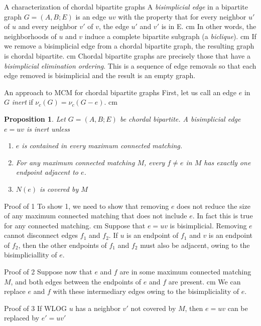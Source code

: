 \documentclass{beamer}
\newtheorem{prop}{Proposition}
\newcommand{\bframe}[2]{\begin{frame}{#1}#2\end{frame}}
\begin{document}
\bframe{A characterization of chordal bipartite graphs}{
A {\it bisimplicial edge} in a bipartite graph $G = (A, B; E)$ is an edge $uv$ with the property that for every neighbor $u'$ of $u$ and every neighbor $v'$ of $v$, the edge $u'$ and $v'$ is in E.\pause\vskip 0.5 cm
In other words, the neighborhoods of $u$ and $v$ induce a complete bipartite subgraph (a {\it biclique}).\pause\vskip 0.5 cm 
If we remove a bisimplicial edge from a chordal bipartite graph, the resulting graph is chordal bipartite.\pause\vskip 0.5 cm
Chordal bipartite graphs are precisely those that have a {\it bisimplicial elimination ordering}.  This is a sequence of edge removals so that each edge removed is bisimplicial and the result is an empty graph.
}
\bframe{An approach to MCM for chordal bipartite graphs}{
First, let us call an edge $e$ in $G$ {\it inert} if $\nu_c(G) = \nu_c(G-e)$. \pause\vskip 0.5 cm
\begin{prop}
Let $G = (A, B; E)$ be chordal bipartite.  A bisimplicial edge $e = uv$ is inert unless
	\begin{enumerate}
		\item $e$ is contained in every maximum connected matching.
		\item For any maximum connected matching $M$, every $f\neq e $ in $M$ has exactly one endpoint adjacent to $e$.
		\item  $N(e)$ is covered by $M$
	\end{enumerate}
\end{prop}


}

\bframe{Proof of 1}{
To show 1, we need to show that removing $e$ does not reduce the size of any maximum connected matching that does not include $e$.  \pause In fact this is true for any connected matching.\pause\vskip 0.5 cm
Suppose that $e = uv$ is bisimplicial. \pause Removing $e$ cannot disconnect edges $f_1$ and $f_2$.  \pause If $u$ is an endpoint of $f_1$ and $v$ is an endpoint of $f_2$, then the other endpoints of $f_1$ and $f_2$ must also be adjacent, owing to the bisimpliciallity of $e$.
}

\bframe{Proof of 2}{
Suppose now that $e$ and $f$ are in some maximum connected matching $M$, and both edges between the endpoints of $e$ and $f$ are present.  \pause\vskip 0.5 cm
We can replace $e$ and $f$ with these intermediary edges owing to the bisimpliciality of $e$.  
}

\bframe{Proof  of 3}{
If WLOG $u$ has a neighbor $v'$ not covered by $M$, then $e=uv$ can be replaced by $e'=uv'$
}
\end{document}
